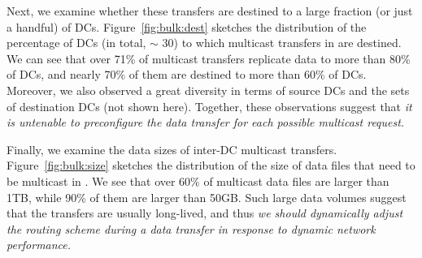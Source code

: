 Next, we examine whether these transfers are destined to
a large fraction (or just a handful) of DCs.
Figure~\ref{fig:bulk:dest} sketches the distribution of the
percentage of DCs (in total, $\sim$ 30) to which multicast
transfers in \company are destined.
We can see that over 71\% of multicast transfers replicate data
to more than 80\% of DCs, and nearly 70\% of them are destined
to more than 60\% of DCs.
Moreover, we also observed a great diversity  in terms of
source DCs and the sets of destination DCs (not shown here).
Together, these observations suggest that {\em it is untenable
to preconfigure the data transfer for each possible multicast
request.}


Finally, we examine the data sizes of inter-DC 
multicast transfers.
Figure~\ref{fig:bulk:size} sketches the distribution of the
size of data files that need to be multicast in \company.
We see that over 60\% of multicast data files are larger than 1TB,
while 90\% of them are larger than 50GB.
Such large data volumes suggest that the transfers are usually
long-lived, and thus {\em we should dynamically adjust
the routing scheme during a data transfer in response to
dynamic network performance.}


